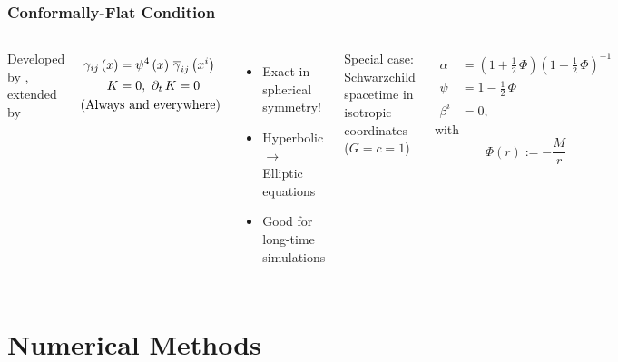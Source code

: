 \documentclass{beamer}
\begin{document}
\begin{frame}
\frametitle{Conformally-Flat Condition}

  \begin{columns}[c]


      Developed by \citet{wmm1996}, extended by \citet{cc2009}

      \begin{align*}
        \gamma_{ij}\left(x\right)
        &=\psi^{4}\left(x\right)\,\overline{\gamma}_{ij}\left(x^{i}\right) \\
        K&=0,\ \p_{t}\,K=0 \\
        &\hspace{-3em}\mathrm{(Always\ and\ everywhere)}
      \end{align*}\vspace{1em}

      \begin{itemize}
        \item Exact in spherical symmetry!
        \item Hyperbolic $\rightarrow$ Elliptic equations
        \item Good for long-time simulations
      \end{itemize}


      Special case: Schwarzchild spacetime in isotropic coordinates
      ($G=c=1$)

      \begin{align*}
        \alpha
          &=\left(1+\frac{1}{2}\,\Phi\right)
            \left(1-\frac{1}{2}\,\Phi\right)^{-1} \\
        \psi
          &=1-\frac{1}{2}\,\Phi \\
        \beta^{i}
          &=0,
      \end{align*}
      with
      \begin{equation*}
        \Phi\left(r\right):=-\frac{M}{r}
      \end{equation*}

  \end{columns}

\end{frame}

\section{Numerical Methods}
\end{document}
